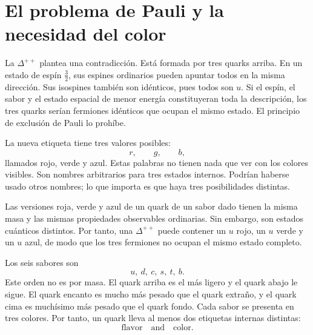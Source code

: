 \begin{classroomqa}
\end{classroomqa}

\section{El problema de Pauli y la necesidad del color}

La \(\Delta^{++}\) plantea una contradicción. Está formada por tres quarks arriba. En un estado de espín \(\tfrac32\), sus espines ordinarios pueden apuntar todos en la misma dirección. Sus isospines también son idénticos, pues todos son \(u\). Si el espín, el sabor y el estado espacial de menor energía constituyeran toda la descripción, los tres quarks serían fermiones idénticos que ocupan el mismo estado. El principio de exclusión de Pauli lo prohíbe.

\begin{classroomqa}
\end{classroomqa}

La nueva etiqueta tiene tres valores posibles:
\begin{equation}
r,\qquad g,\qquad b,
\end{equation}
llamados rojo, verde y azul. Estas palabras no tienen nada que ver con los colores visibles. Son nombres arbitrarios para tres estados internos. Podrían haberse usado otros nombres; lo que importa es que haya tres posibilidades distintas.

Las versiones roja, verde y azul de un quark de un sabor dado tienen la misma masa y las mismas propiedades observables ordinarias. Sin embargo, son estados cuánticos distintos. Por tanto, una \(\Delta^{++}\) puede contener un \(u\) rojo, un \(u\) verde y un \(u\) azul, de modo que los tres fermiones no ocupan el mismo estado completo.

Los seis sabores son
\begin{equation}
u,\ d,\ c,\ s,\ t,\ b.
\end{equation}
Este orden no es por masa. El quark arriba es el más ligero y el quark abajo le sigue. El quark encanto es mucho más pesado que el quark extraño, y el quark cima es muchísimo más pesado que el quark fondo. Cada sabor se presenta en tres colores. Por tanto, un quark lleva al menos dos etiquetas internas distintas:
\begin{equation}
\text{flavor}\quad\text{and}\quad\text{color}.
\end{equation}

